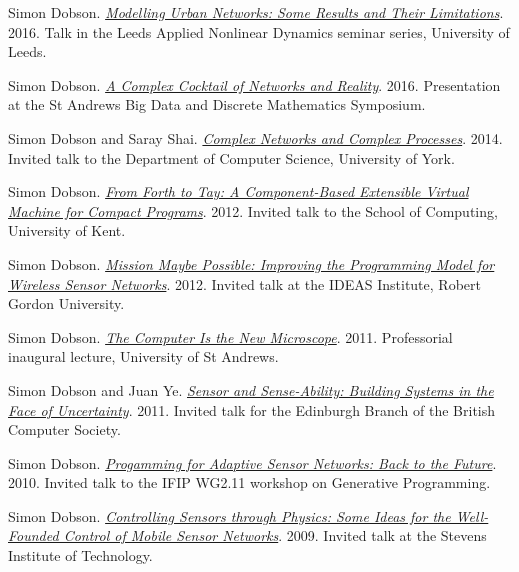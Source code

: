 \documentclass[11pt]{article}
\begin{document}
\label{org0555aca}Simon Dobson.  \emph{\href{https://simondobson.org/softcopy/urban-networks-16.pdf}{Modelling Urban Networks: Some Results and Their Limitations}}. 2016. Talk in the Leeds Applied Nonlinear Dynamics seminar series, University of Leeds.

\label{org3e2d37a}Simon Dobson.  \emph{\href{https://simondobson.org/softcopy/complex-cocktail.pdf}{A Complex Cocktail of Networks and Reality}}. 2016. Presentation at the St Andrews Big Data and Discrete Mathematics Symposium.

\label{org180a059}Simon Dobson and Saray Shai.  \emph{\href{https://simondobson.org/softcopy/complex-networks-complex-processes.pdf}{Complex Networks and Complex Processes}}. 2014. Invited talk to the Department of Computer Science, University of York.

\label{orgc483d21}Simon Dobson.  \emph{\href{https://simondobson.org/softcopy/forth-tay.pdf}{From Forth to Tay: A Component-Based Extensible Virtual Machine for Compact Programs}}. 2012. Invited talk to the School of Computing, University of Kent.

\label{org4c790b3}Simon Dobson.  \emph{\href{https://simondobson.org/softcopy/mission-maybe-possible.pdf}{Mission Maybe Possible: Improving the Programming Model for Wireless Sensor Networks}}. 2012. Invited talk at the IDEAS Institute, Robert Gordon University.

\label{org04e9b3f}Simon Dobson.  \emph{\href{https://simondobson.org/softcopy/inaugural-lecture-sta-web-20111207.pdf}{The Computer Is the New Microscope}}. 2011. Professorial inaugural lecture, University of St Andrews.

\label{org7162950}Simon Dobson and Juan Ye.  \emph{\href{https://simondobson.org/softcopy/sensor-and-senseability-nontechnical.pdf}{Sensor and Sense-Ability: Building Systems in the Face of Uncertainty}}. 2011. Invited talk for the Edinburgh Branch of the British Computer Society.

\label{orgfed5744}Simon Dobson.  \emph{\href{https://simondobson.org/softcopy/back-to-the-future-talk-gp10.pdf}{Progamming for Adaptive Sensor Networks: Back to the Future}}. 2010. Invited talk to the IFIP WG2.11 workshop on Generative Programming.

\label{orgbea5558}Simon Dobson.  \emph{\href{https://simondobson.org/softcopy/well-founded-control-talk.pdf}{Controlling Sensors through Physics: Some Ideas for the Well-Founded Control of Mobile Sensor Networks}}. 2009. Invited talk at the Stevens Institute of Technology.
\end{document}
